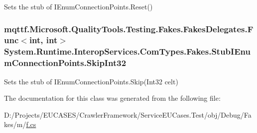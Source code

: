 Sets the stub of I\-Enum\-Connection\-Points.\-Reset()

\hypertarget{class_system_1_1_runtime_1_1_interop_services_1_1_com_types_1_1_fakes_1_1_stub_i_enum_connection_points_aee3ffb49d1b7f366003243a9396c813d}{
\subsubsection[{Skip\-Int32}]{\setlength{\rightskip}{0pt plus 5cm}mqttf.\-Microsoft.\-Quality\-Tools.\-Testing.\-Fakes.\-Fakes\-Delegates.\-Func$<$int, int$>$ System.\-Runtime.\-Interop\-Services.\-Com\-Types.\-Fakes.\-Stub\-I\-Enum\-Connection\-Points.\-Skip\-Int32}}\label{class_system_1_1_runtime_1_1_interop_services_1_1_com_types_1_1_fakes_1_1_stub_i_enum_connection_points_aee3ffb49d1b7f366003243a9396c813d}


Sets the stub of I\-Enum\-Connection\-Points.\-Skip(\-Int32 celt)



The documentation for this class was generated from the following file\-:\begin{DoxyCompactItemize}
\item 
D\-:/\-Projects/\-E\-U\-C\-A\-S\-E\-S/\-Crawler\-Framework/\-Service\-E\-U\-Cases.\-Test/obj/\-Debug/\-Fakes/m/\hyperlink{m_2f_8cs}{f.\-cs}\end{DoxyCompactItemize}
